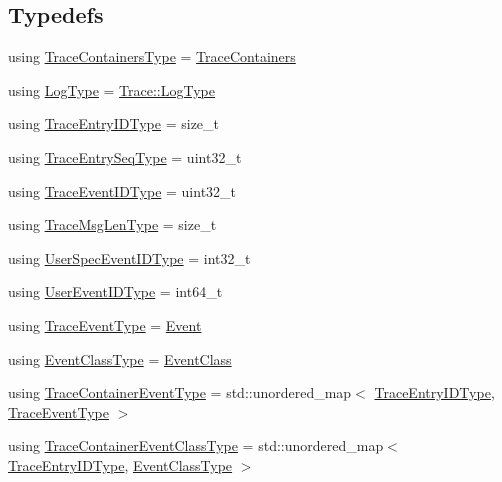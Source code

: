 \subsection*{Typedefs}
\begin{DoxyCompactItemize}
\item 
using \hyperlink{namespacevt_1_1trace_a526573625774f28d49baddd61b9c701c}{Trace\+Containers\+Type} = \hyperlink{classvt_1_1trace_1_1_trace_containers}{Trace\+Containers}
\item 
using \hyperlink{namespacevt_1_1trace_abf816ddd3c20f0f8d974662f373b088d}{Log\+Type} = \hyperlink{structvt_1_1trace_1_1_trace_a43306d96a91e49db081eaea016f1dd0a}{Trace\+::\+Log\+Type}
\item 
using \hyperlink{namespacevt_1_1trace_a3c14050715ba9eceaeff51fb3de64f2f}{Trace\+Entry\+I\+D\+Type} = size\+\_\+t
\item 
using \hyperlink{namespacevt_1_1trace_a522028dd2a7d056f0ec3d417836fdecd}{Trace\+Entry\+Seq\+Type} = uint32\+\_\+t
\item 
using \hyperlink{namespacevt_1_1trace_a64a7185f3e102df8d8258f263ccd1582}{Trace\+Event\+I\+D\+Type} = uint32\+\_\+t
\item 
using \hyperlink{namespacevt_1_1trace_aeb598f45d67d41db7902e494f2f0ce59}{Trace\+Msg\+Len\+Type} = size\+\_\+t
\item 
using \hyperlink{namespacevt_1_1trace_a70c43e0e1596eea236912d4197d3120a}{User\+Spec\+Event\+I\+D\+Type} = int32\+\_\+t
\item 
using \hyperlink{namespacevt_1_1trace_a5908920d051c144c89f17c69ed262350}{User\+Event\+I\+D\+Type} = int64\+\_\+t
\item 
using \hyperlink{namespacevt_1_1trace_a79b7fa947245c08d04a3ea67fbff2c30}{Trace\+Event\+Type} = \hyperlink{structvt_1_1trace_1_1_event}{Event}
\item 
using \hyperlink{namespacevt_1_1trace_afc5456ac95b0d3e9bb63a21597f5660c}{Event\+Class\+Type} = \hyperlink{structvt_1_1trace_1_1_event_class}{Event\+Class}
\item 
using \hyperlink{namespacevt_1_1trace_a80118aaa48fed940af3899800bba2303}{Trace\+Container\+Event\+Type} = std\+::unordered\+\_\+map$<$ \hyperlink{namespacevt_1_1trace_a3c14050715ba9eceaeff51fb3de64f2f}{Trace\+Entry\+I\+D\+Type}, \hyperlink{namespacevt_1_1trace_a79b7fa947245c08d04a3ea67fbff2c30}{Trace\+Event\+Type} $>$
\item 
using \hyperlink{namespacevt_1_1trace_a352c8799ee88afa3f1b7008952ed8485}{Trace\+Container\+Event\+Class\+Type} = std\+::unordered\+\_\+map$<$ \hyperlink{namespacevt_1_1trace_a3c14050715ba9eceaeff51fb3de64f2f}{Trace\+Entry\+I\+D\+Type}, \hyperlink{namespacevt_1_1trace_afc5456ac95b0d3e9bb63a21597f5660c}{Event\+Class\+Type} $>$
\end{DoxyCompactItemize}
